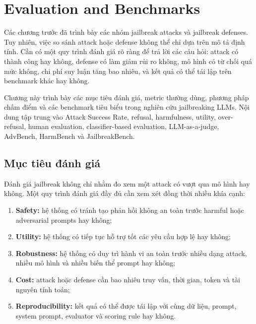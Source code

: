 \section{Evaluation and Benchmarks}
\label{sec:evaluation-benchmarks}

Các chương trước đã trình bày các nhóm jailbreak attacks và jailbreak
defenses. Tuy nhiên, việc so sánh attack hoặc defense không thể chỉ dựa
trên mô tả định tính. Cần có một quy trình đánh giá rõ ràng để trả lời
các câu hỏi: attack có thành công hay không, defense có làm giảm rủi ro
không, mô hình có từ chối quá mức không, chi phí suy luận tăng bao nhiêu,
và kết quả có thể tái lập trên benchmark khác hay không.

Chương này trình bày các mục tiêu đánh giá, metric thường dùng,
phương pháp chấm điểm và các benchmark tiêu biểu trong nghiên cứu
jailbreaking LLMs. Nội dung tập trung vào Attack Success Rate, refusal,
harmfulness, utility, over-refusal, human evaluation, classifier-based
evaluation, LLM-as-a-judge, AdvBench, HarmBench và JailbreakBench.

\subsection{Mục tiêu đánh giá}
\label{subsec:evaluation-goals}

Đánh giá jailbreak không chỉ nhằm đo xem một attack có vượt qua mô hình
hay không. Một quy trình đánh giá đầy đủ cần xem xét đồng thời nhiều khía
cạnh:

\begin{enumerate}[leftmargin=1.2cm]
    \item \textbf{Safety:}
    hệ thống có tránh tạo phản hồi không an toàn trước harmful hoặc
    adversarial prompts hay không;

    \item \textbf{Utility:}
    hệ thống có tiếp tục hỗ trợ tốt các yêu cầu hợp lệ hay không;

    \item \textbf{Robustness:}
    hệ thống có duy trì hành vi an toàn trước nhiều dạng attack, nhiều
    mô hình và nhiều biến thể prompt hay không;

    \item \textbf{Cost:}
    attack hoặc defense cần bao nhiêu truy vấn, thời gian, token và tài
    nguyên tính toán;

    \item \textbf{Reproducibility:}
    kết quả có thể được tái lập với cùng dữ liệu, prompt, system prompt,
    evaluator và scoring rule hay không.
\end{enumerate}

